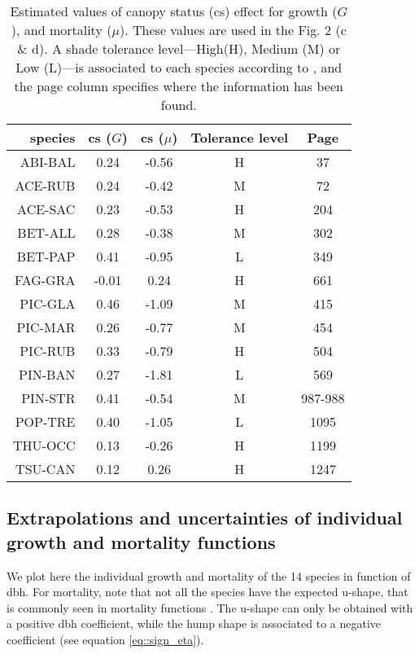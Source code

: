 \documentclass[letterpaper, 12pt]{article}
\theoremstyle{theo}
\begin{document}
\begin{refsection}
\begin{onehalfspace}
\begin{table}[h!]
\centering
\caption{Estimated values of canopy status (cs) effect for growth ($ G $), and mortality ($ \mu $). These values are used in the Fig. 2 (c \& d). A shade tolerance level---High(H), Medium (M) or Low (L)---is associated to each species according to \citet{Burns1990, Burns1990a}, and the page column specifies where the information has been found. \label{tab::cs}}
\begin{tabular}{@{}rcccc@{}}
	\toprule
	\bfseries{species} & \bfseries{cs} ($ G $) & \bfseries{cs} ($ \mu $) & \bfseries{Tolerance level} & \bfseries{Page} \\
	\midrule
	ABI-BAL & 0.24 & -0.56 & H & 37 \\
	ACE-RUB & 0.24 & -0.42 & M & 72 \\
	ACE-SAC & 0.23 & -0.53 & H & 204 \\
	BET-ALL & 0.28 & -0.38 & M & 302 \\
	BET-PAP & 0.41 & -0.95 & L & 349 \\
	FAG-GRA & -0.01 & 0.24 & H & 661 \\
	PIC-GLA & 0.46 & -1.09 & M & 415 \\
	PIC-MAR & 0.26 & -0.77 & M & 454 \\
	PIC-RUB & 0.33 & -0.79 & H & 504 \\
	PIN-BAN & 0.27 & -1.81 & L & 569 \\
	PIN-STR & 0.41 & -0.54 & M & 987-988 \\
	POP-TRE & 0.40 & -1.05 & L & 1095 \\
	THU-OCC & 0.13 & -0.26 & H & 1199 \\
	TSU-CAN & 0.12 & 0.26 & H & 1247 \\
	\bottomrule
\end{tabular}
\end{table}

\subsection{Extrapolations and uncertainties of individual growth and mortality functions}
We plot here the individual growth and mortality of the 14 species in function of dbh. For mortality, note that not all the species have the expected u-shape, that is commonly seen in mortality functions \citep{Lines2010}. The u-shape can only be obtained with a positive dbh coefficient, while the hump shape is associated to a negative coefficient (see equation \eqref{eq::sign_eta}).


\end{onehalfspace}
\end{refsection}
\end{document}

